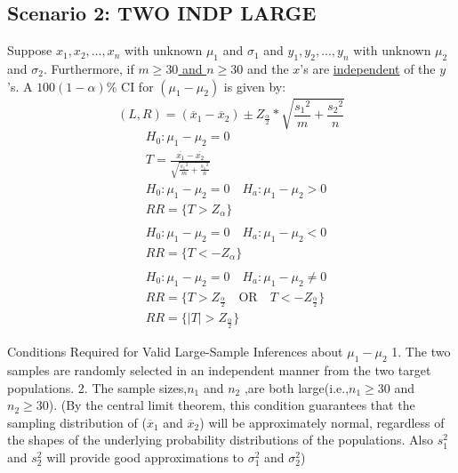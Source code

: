 \documentclass[fontsize=6pt, paper=a4]{scrartcl}
\begin{document}
\begin{multicols*}{4}
{\subsection{Scenario 2: TWO INDP LARGE}
Suppose $x_1,x_2,...,x_n$ with unknown $\mu_1$ and $\sigma_1$ and $y_1,y_2,...,y_n$ with unknown $\mu_2$ and $\sigma_2$. Furthermore, if \underline{$m \geq 30$ and $n \geq 30$} and the $x$'s are \underline{independent} of the $y$'s. A $100(1-\alpha)\%$ CI for $(\mu_1-\mu_2)$ is given by:
\begin{equation}
	(L,R)=(\overline{x}_1-\overline{x}_2)\pm Z_{\frac{\alpha}{2}}*\sqrt{\frac{{s_1}^2}{m}+\frac{{s_2}^2}{n}}
\end{equation}
\begin{align}
	&H_0:\mu_1-\mu_2=0\\
	&T=\frac{\overline{x_1}-\overline{x_2}}{\sqrt{\frac{{s_1}^2}{m}+\frac{{s_1}^2}{n}}}\\ 
	&H_0:\mu_1-\mu_2=0 \quad H_a:\mu_1-\mu_2>0\\
	&RR= \{ T> Z_\alpha \}\\ \\
	&H_0:\mu_1-\mu_2=0 \quad H_a:\mu_1-\mu_2<0\\
	&RR= \{ T< -Z_\alpha \}\\ \\
	&H_0:\mu_1-\mu_2=0 \quad H_a:\mu_1 -\mu_2\neq 0\\
	&RR= \{ T> Z_{\frac{\alpha}{2}} \quad \textrm{OR} \quad T<- Z_{\frac{\alpha}{2}} \} \\
	&RR= \{ \left|T\right|> Z_{\frac{\alpha}{2}}\}
\end{align}
  
Conditions Required for Valid Large-Sample Inferences about $\mu_1-\mu_2$
1. The two samples are randomly selected in an independent manner from the two
target populations.
2. The sample sizes,$n_1$ and $n_2$ ,are both large(i.e.,$n_1 \geq 30$ and $n_2 \geq 30$). (By the central limit theorem, this condition guarantees that the sampling distribution of ($\overline{x}_1$ and $\overline{x}_2$) will be approximately normal, regardless of the shapes of the underlying probability distributions of the populations. Also $s_1^2$ and $s_2^2$ will provide good approximations to $\sigma_1^2$ and $\sigma_2^2$)

}
\end{multicols*}
\end{document}
